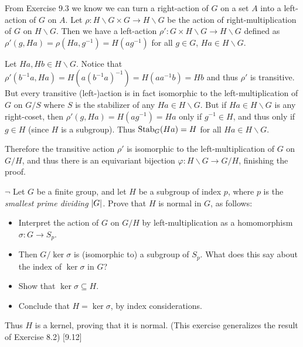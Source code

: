 \begin{solution}
	From Exercise 9.3 we know we can turn a right-action of $G$ on a set $A$ into a left-action of $G$ on $A$. Let $\rho: H \backslash G \times G \to H \backslash G$ be the action of right-multiplication of $G$ on $H \backslash G$. Then we have a left-action $\rho': G \times H \backslash G \to H \backslash G$ defined as $\rho'(g, Ha) = \rho(Ha, g^{-1}) = H(ag^{-1})$ for all $g \in G$, $Ha \in H \backslash G$.
	
	Let $Ha, Hb \in H \backslash G$. Notice that $\rho'(b^{-1}a, Ha) = H(a(b^{-1}a)^{-1}) = H(aa^{-1}b) = Hb$ and thus $\rho'$ is transitive. But every transitive (left-)action is in fact isomorphic to the left-multiplication of $G$ on $G/S$ where $S$ is the stabilizer of any $Ha \in H \backslash G$. But if $Ha \in H \backslash G$ is any right-coset, then $\rho'(g, Ha) = H(ag^{-1}) = Ha$ only if $g^{-1} \in H$, and thus only if $g \in H$ (since $H$ is a subgroup). Thus $\operatorname{Stab}_G(Ha) = H$ for all $Ha \in H \backslash G$.
	
	Therefore the transitive action $\rho'$ is isomorphic to the left-multiplication of $G$ on $G/H$, and thus there is an equivariant bijection $\varphi: H \backslash G \to G/H$, finishing the proof.
\end{solution}

\begin{problem}
	$\neg$ Let $G$ be a finite group, and let $H$ be a subgroup of index $p$, where $p$ is the \emph{smallest prime dividing} $\left|G\right|$. Prove that $H$ is normal in $G$, as follows:
	\begin{itemize}
		\item Interpret the action of $G$ on $G/H$ by left-multiplication as a homomorphism $\sigma: G \to S_p$.
		\item Then $G/ \ker \sigma$ is (isomorphic to) a subgroup of $S_p$. What does this say about the index of $\ker \sigma$ in $G$?
		\item Show that $\ker \sigma \subseteq H$.
		\item Conclude that $H = \ker \sigma$, by index considerations.
	\end{itemize}
	Thus $H$ is a kernel, proving that it is normal. (This exercise generalizes the result of Exercise 8.2) [9.12]
\end{problem}

